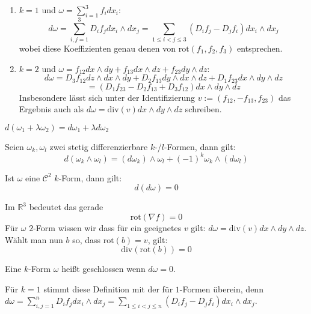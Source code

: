 \begin{remark}\leavevmode
	\begin{enumerate}
		\item $k=1$ und $\omega = \sum_{i=1}^3 f_i dx_i$: $$d\omega = \sum_{i,j=1}^3 D_i f_j dx_i\wedge dx_j = \sum_{1\leq i < j \leq 3}(D_i f_j - D_j f_i)dx_i\wedge dx_j$$ wobei diese Koeffizienten genau denen von $\text{rot}(f_1,f_2,f_3)$ entsprechen.
		\item $k=2$ und $\omega = f_{12}dx\wedge dy + f_{13}dx\wedge dz+f_{23}dy\wedge dz$: $$d\omega = D_3 f_{12} dz\wedge dx\wedge dy + D_2 f_{13}dy\wedge dx\wedge dz + D_1 f_{23}dx\wedge dy\wedge dz$$
		$$= (D_1 f_{23} - D_2 f_{13} + D_3 f_{12})dx\wedge dy\wedge dz$$ Insbesondere l\"asst sich unter der Identifizierung $v:=(f_{12},-f_{13},f_{23})$ das Ergebnis auch als $d\omega = \text{div}(v)dx\wedge dy\wedge dz$ schreiben.
	\end{enumerate}
\end{remark}
\begin{lemma}[Linearit\"at]
	$d(\omega_1 + \lambda \omega_2) = d\omega_1 + \lambda d\omega_2$
\end{lemma}

\begin{theorem} Seien $\omega_k,\omega_l$ zwei stetig differenzierbare $k$-/$l$-Formen, dann gilt:
	$$d(\omega_k\wedge\omega_l) = (d\omega_k)\wedge\omega_l+(-1)^k\omega_k\wedge(d\omega_l)$$
\end{theorem}
\begin{theorem}[$d\circ d = 0$]
	Ist $\omega$ eine $\mathcal C^2$ $k$-Form, dann gilt:
	$$d(d\omega)=0$$
\end{theorem}
\begin{remark}
	Im $\mathbb R^3$ bedeutet das gerade $$\text{rot}(\nabla f)=0$$ F\"ur $\omega$ $2$-Form wissen wir dass f\"ur ein geeignetes $v$ gilt: $d\omega = \text{div}(v)dx\wedge dy\wedge dz$. W\"ahlt man nun $b$ so, dass $\text{rot}(b)=v$, gilt: $$\text{div}(\text{rot}(b))=0$$
\end{remark}

\begin{definition}[Geschlossenheit]
	Eine $k$-Form $\omega$ hei\ss t geschlossen wenn $d\omega = 0$.
\end{definition}
\begin{remark}
	F\"ur $k=1$ stimmt diese Definition mit der f\"ur $1$-Formen \"uberein, denn $d\omega = \sum_{i,j=1}^n D_i f_j dx_i\wedge dx_j = \sum_{1\leq i < j \leq n}(D_i f_j - D_j f_i)dx_i\wedge dx_j$.
\end{remark}

